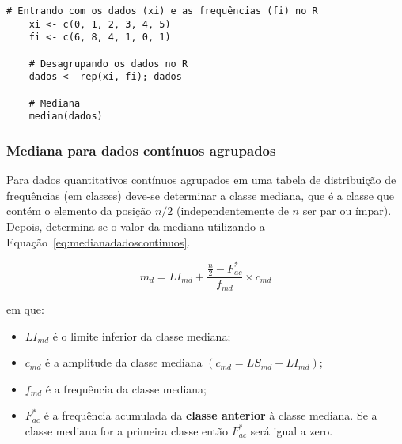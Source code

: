 \documentclass[11pt,fleqn]{book} %
\begin{document}
\begin{scriptsize}
	\estiloR
	\begin{lstlisting}[caption={Comandos do software R}, label=lst:Rmediana2]
	# Entrando com os dados (xi) e as frequências (fi) no R
	xi <- c(0, 1, 2, 3, 4, 5)
	fi <- c(6, 8, 4, 1, 0, 1)

	# Desagrupando os dados no R
	dados <- rep(xi, fi); dados
	
	# Mediana
	median(dados)

	\end{lstlisting}
\end{scriptsize}


\subsubsection{Mediana para dados contínuos agrupados}
\vspace{0,3cm}

Para dados quantitativos contínuos agrupados em uma tabela de distribuição de frequências (em classes) deve-se determinar a classe mediana, que é a classe que contém o elemento da posição $n/2$ (independentemente de $n$ ser par ou ímpar). Depois, determina-se o valor da mediana utilizando a Equação~\ref{eq:medianadadoscontinuos}.

\begin{eBox}
\vspace{-0.5cm}
\begin{equation} \label{eq:medianadadoscontinuos}
	m_d=LI_{md}+\frac{\frac{n}{2}-F_{ac}^*}{f_{md}} \times c_{md}
\end{equation}
\end{eBox}

\vspace{0,3cm}
\noindent em que:
\vspace{0,3cm}

\begin{itemize}

\item $LI_{md}$ é o limite inferior da classe mediana;

\item $c_{md}$ é a amplitude da classe mediana $(c_{md}=LS_{md}-LI_{md})$;

\item $f_{md}$ é a frequência da classe mediana;

\item $F_{ac}^*$ é a frequência acumulada da {\bf classe anterior} à classe mediana. Se a classe mediana for a primeira classe então $F_{ac}^*$ será igual a zero.

\end{itemize}
	
\end{document}
